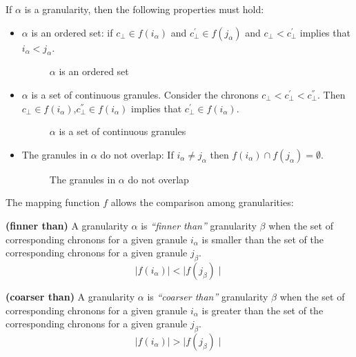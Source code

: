 If $\alpha$ is a granularity, then the following properties must hold:\\
\begin{itemize}
\item
$\alpha$ is an ordered set: if $c_\bot \in f(i_\alpha)$ and $c^{'}_\bot \in f(j_\alpha)$ and $c_\bot < c^{'}_\bot$ implies that $i_\alpha < j_\alpha$.
\begin{figure}
\centering

\caption{$\alpha$ is an ordered set}
\label{fig:granularity-prop1}
\end{figure}
\item
$\alpha$ is a set of continuous granules. Consider the chronons $c_\bot < c^{'}_\bot < c^{''}_\bot$. Then $c_\bot \in f(i_\alpha)$,$c^{''}_\bot \in f(i_\alpha)$ implies that $c^{'}_\bot \in f(i_\alpha)$.
\begin{figure}
\centering

\caption{$\alpha$ is a set of continuous granules}
\label{fig:granularity-prop2}
\end{figure}
\item
The granules in $\alpha$ do not overlap: If $i_\alpha \neq j_\alpha$ then $f(i_\alpha) \cap f(j_\alpha) = \emptyset$.
\begin{figure}
\centering

\caption{The granules in $\alpha$ do not overlap}
\label{fig:granularity-prop3}
\end{figure}
\end{itemize}

The mapping function $f$ allows the comparison among granularities:

\begin{definition}
\label{def:finner-than}\textbf{(finner than)}
A granularity $\alpha$ is \emph{``finner than''} granularity $\beta$ when the set of corresponding chronons for a given granule $i_\alpha$ is smaller than the set of the corresponding chronons for a given granule $j_\beta$.
\begin{equation}
\label{eq:finner-than}
\mid f \left( i_\alpha \right) \mid < \mid  f \left( j_\beta \right) \mid
\end{equation} 
\end{definition}

\begin{definition}
\label{def:coarser-than}\textbf{(coarser than)}
A granularity $\alpha$ is \emph{``coarser than''} granularity $\beta$ when the set of corresponding chronons for a given granule $i_\alpha$ is greater than the set of the corresponding chronons for a given granule $j_\beta$.
\begin{equation}
\label{eq:coarser-than}
\mid f \left( i_\alpha \right) \mid > \mid  f \left( j_\beta \right) \mid
\end{equation} 
\end{definition}




